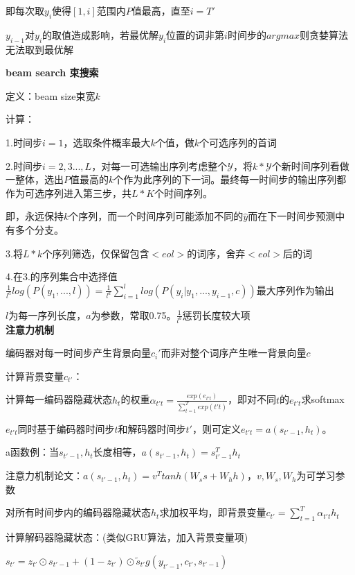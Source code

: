 \documentclass[UTF8]{ctexart}
\begin{document}
  \quad \quad 即每次取$y_i$使得$[1, i]$范围内$P$值最高，直至$i = T'$

  \quad \quad $y_{i-1}$对$y_i$的取值造成影响，若最优解$y_i$位置的词非第$i$时间步的$argmax$则贪婪算法无法取到最优解

  \textbf{beam search 束搜索}
  
  \quad 定义：beam size束宽$k$

  \quad 计算：
  
  \quad \quad 1.时间步$i = 1$，选取条件概率最大$k$个值，做$k$个可选序列的首词
  
  \quad \quad 2.时间步$i = 2,3...,L$，对每一可选输出序列考虑整个$\mathcal{Y} $，将$k*\mathcal{Y} $个新时间序列看做一整体，选出$P$值最高的$k$个作为此序列的下一词。最终每一时间步的输出序列都作为可选序列进入第三步，共$L*K$个时间序列。
  
  \quad \quad \quad 即，永远保持$k$个序列，而一个时间序列可能添加不同的$\hat{y}$而在下一时间步预测中有多个分支。
  
  \quad \quad 3.将$L*k$个序列筛选，仅保留包含$<eol>$的词序，舍弃$<eol>$后的词
  
  \quad \quad 4.在3.的序列集合中选择值$\frac{1}{l^a}log(P(y_1, ...,l))=\frac{1}{l^a}\sum_{i=1}^llog(P(y_i|y_1, ..., y_{i-1}, c))$最大序列作为输出
  
  \quad \quad \quad $l$为每一序列长度，$a$为参数，常取0.75。$\frac{1}{l^a}$惩罚长度较大项\\
\textbf{注意力机制}

  编码器对每一时间步产生背景向量$c_i'$而非对整个词序产生唯一背景向量$c$

  计算背景变量$c_{t'}$：

  \quad 计算每一编码器隐藏状态$h_t$的权重$\alpha_{t't} = \frac{exp(e_{t't})}{\sum_{t=1}^{T}exp(t't)}$，即对不同$t$的$e_{t't}$求softmax

  \quad \quad $e_{t't}$同时基于编码器时间步$t$和解码器时间步$t'$，则可定义$e_{t't} = a(s_{t'-1}, h_t)$。

  \quad \quad \quad a函数例：当$s_{t'-1}, h_t$长度相等，$a(s_{t'-1}, h_t) = s_{t'-1}^Th_t$

  \quad \quad \quad 注意力机制论文：$a(s_{t'-1}, h_t) = v^Ttanh(W_ss + W_hh)$，$v, W_s, W_h$为可学习参数

  \quad 对所有时间步内的编码器隐藏状态$h_t$求加权平均，即背景变量$c_{t'} = \sum_{t=1}^{T}\alpha_{t't}h_t$

  计算解码器隐藏状态：(类似GRU算法，加入背景变量项)
  
  \quad $s_{t'} = z_{t'} \odot s_{t'-1} + (1-z_{t'}) \odot \tilde{s}_{t'}g(y_{t'-1}, c_{t'}, s_{t'-1})$
\end{document}
